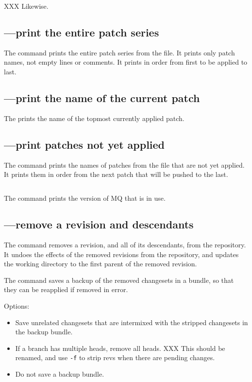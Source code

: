 XXX Likewise.

\subsection{---print the entire patch series}

The  command prints the entire patch series from the
 file.  It prints only patch names, not empty lines
or comments.  It prints in order from first to be applied to last.

\subsection{---print the name of the current patch}

The  prints the name of the topmost currently applied
patch.

\subsection{---print patches not yet applied}

The  command prints the names of patches from the
 file that are not yet applied.  It prints them in
order from the next patch that will be pushed to the last.

\subsection{}

The  command prints the version of MQ that is in use.

\subsection{---remove a revision and descendants}

The  command removes a revision, and all of its
descendants, from the repository.  It undoes the effects of the
removed revisions from the repository, and updates the working
directory to the first parent of the removed revision.

The  command saves a backup of the removed changesets in
a bundle, so that they can be reapplied if removed in error.

Options:
\begin{itemize}
\item[\hgopt{strip}{-b}] Save unrelated changesets that are intermixed
  with the stripped changesets in the backup bundle.
\item[\hgopt{strip}{-f}] If a branch has multiple heads, remove all
  heads. XXX This should be renamed, and use \texttt{-f} to strip revs
  when there are pending changes.
\item[\hgopt{strip}{-n}] Do not save a backup bundle.
\end{itemize}

